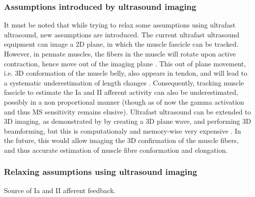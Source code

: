 \subsubsection{Assumptions introduced by ultrasound imaging}
It must be noted that while trying to relax some assumptions using ultrafast ultrasound, new assumptions are introduced. The current ultrafast ultrasound equipment can image a 2D plane, in which the muscle fascicle can be tracked. However, in pennate muscles, the fibers in the muscle will rotate upon active contraction, hence move out of the imaging plane \cite{finni_structural_2006}. This out of plane movement, i.e. 3D conformation of the muscle belly, also appears in tendon, and will lead to a systematic underestimation of length changes \cite{seynnes_ultrasound-based_2014}. Consequently, tracking muscle fascicle to estimate the Ia and II afferent activity can also be underestimated, possibly in a non proportional manner (though as of now the gamma activation and thus MS sensitivity remains elusive). Ultrafast ultrasound can be extended to 3D imaging, as demonstrated by \citeauthor{provost_3d_2014} by creating a 3D plane wave, and performing 3D beamforming, but this is computationaly and memory-wise very expensive \cite{provost_3d_2014}. In the future, this would allow imaging the 3D confirmation of the muscle fibers, and thus accurate estimation of muscle fibre conformation and elongation. 



\subsubsection{Relaxing assumptions using ultrasound imaging}
Source of Ia and II afferent feedback. 

